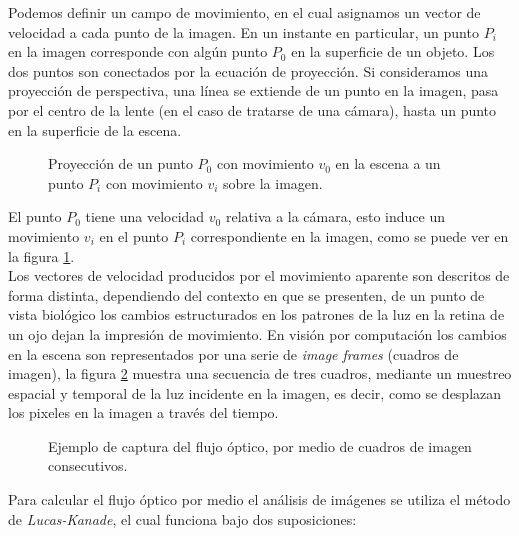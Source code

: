 \documentclass{iccmemoria}
\begin{document}
Podemos definir un campo de movimiento, en el cual asignamos un vector de velocidad a cada punto de la imagen. En un instante en particular, un punto $P_i$ en la imagen corresponde con algún punto $P_0$ en la superficie de un objeto. Los dos puntos son conectados por la ecuación de proyección. Si consideramos una proyección de perspectiva, una línea se extiende de un punto en la imagen, pasa por el centro de la lente (en el caso de tratarse de una cámara), hasta un punto en la superficie de la escena.\\


\begin{figure}[H]
  \centering
  
  \caption[Proyección de un punto sobre la imagen.]{Proyección de un punto $P_0$ con movimiento $v_0$ en la escena  a un punto $P_i$ con movimiento $v_i$ sobre la imagen.}
  \label{fig:proyeccion_flujo_optico}
\end{figure}

El punto $P_{0}$ tiene una velocidad $v_{0}$ relativa a la cámara, esto induce un movimiento $v_{i}$ en el punto $P_{i}$ correspondiente en la imagen, como se puede ver en la figura \ref{fig:proyeccion_flujo_optico}\cite{horn1986robot}.\\

Los vectores de velocidad producidos por el movimiento aparente son descritos de forma distinta, dependiendo del contexto en que se presenten, de un punto de vista biológico los cambios estructurados en los patrones de la luz en la retina de un ojo dejan la impresión de movimiento. En visión por computación los cambios en la escena son representados por una serie de \emph{image frames} (cuadros de imagen), la figura \ref{fig:ejemplo_flujo_optico} muestra una secuencia de tres cuadros, mediante un muestreo espacial y temporal de la luz incidente en la imagen, es decir, como se desplazan los pixeles en la imagen a través del tiempo.\\

\begin{figure}[H]
  \centering
  
  \caption[Captura de flujo óptico.]{Ejemplo de captura del flujo óptico, por medio de cuadros de imagen consecutivos.}
  \label{fig:ejemplo_flujo_optico}
\end{figure}

Para calcular el flujo óptico por medio el análisis de imágenes se utiliza el método de \emph{Lucas-Kanade}, el cual funciona bajo dos suposiciones:
\end{document}
